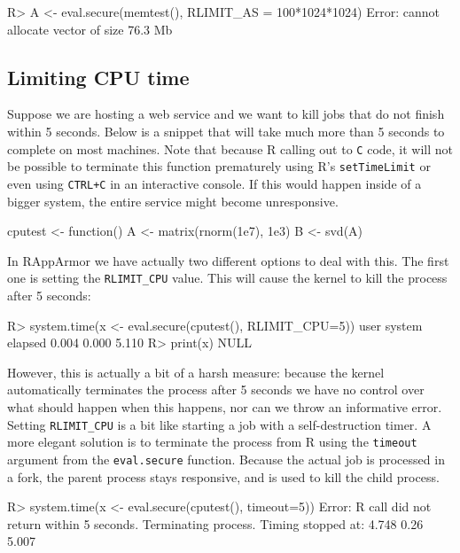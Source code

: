\documentclass{jss}
\newcommand{\R}{\textsf{R}\xspace}
\begin{document}
\begin{appendices}
\begin{CodeChunk}
\begin{CodeInput}
R> A <- eval.secure(memtest(), RLIMIT_AS = 100*1024*1024)
Error: cannot allocate vector of size 76.3 Mb
\end{CodeInput}
\end{CodeChunk}


\subsection{Limiting CPU time}
\label{cputime}

Suppose we are hosting a web service and we want to kill jobs that do not
finish within 5 seconds. Below is a snippet that will take much more than 5
seconds to complete on most machines. Note that because \R calling out to
\texttt{C} code, it will not be possible to terminate this function prematurely
using R's \texttt{setTimeLimit} or even using \texttt{CTRL+C} in an interactive
console. If this would happen inside of a bigger system, the entire service
might become unresponsive.

\begin{CodeChunk}
\begin{CodeInput}
cputest <- function(){
  A <- matrix(rnorm(1e7), 1e3)
  B <- svd(A)
}
\end{CodeInput}
\end{CodeChunk}
In RAppArmor we have actually two different options to deal with this. The first
one is setting the \texttt{RLIMIT\_CPU} value. This will cause the kernel to
kill the process after 5 seconds:
\begin{CodeChunk}
\begin{CodeInput}
R> system.time(x <- eval.secure(cputest(), RLIMIT_CPU=5))
   user  system elapsed 
  0.004   0.000   5.110 
R> print(x)
NULL
\end{CodeInput}
\end{CodeChunk}
However, this is actually a bit of a harsh measure: because the kernel
automatically terminates the process after 5 seconds we have no control over
what should happen when this happens, nor can we throw an informative error.
Setting \texttt{RLIMIT\_CPU} is a bit like starting a job with a
self-destruction timer. A more elegant solution is to terminate the process
from \R using the \texttt{timeout} argument from the \texttt{eval.secure}
function. Because the actual job is processed in a fork, the parent process
stays responsive, and is used to kill the child process.
\begin{CodeChunk}
\begin{CodeInput}
R> system.time(x <- eval.secure(cputest(), timeout=5))
Error: R call did not return within 5 seconds. Terminating process.
Timing stopped at: 4.748 0.26 5.007
\end{CodeInput}
\end{CodeChunk}


\end{appendices}
\end{document}
